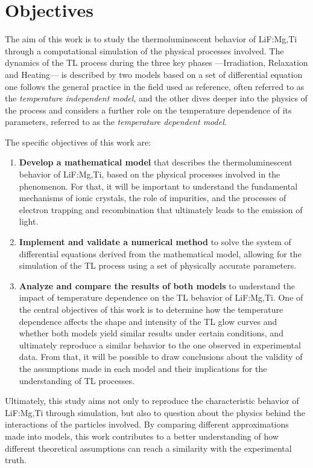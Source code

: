 \chapter{Objectives}\label{ch:2}

The aim of this work is to study the thermoluminescent behavior of LiF:Mg,Ti through a computational simulation of the physical processes involved. The dynamics of the TL process during the three key phases ---Irradiation, Relaxation and Heating--- is described by two models based on a set of differential equation one follows the general practice in the field used as reference, often referred to as the \textit{temperature independent model}, and the other dives deeper into the physics of the process and considers a further role on the temperature dependence of its parameters, referred to as the \textit{temperature dependent model}.

\vspace{10pt}

The specific objectives of this work are:
\begin{enumerate}[label=\textbf{\arabic*.}, font=\bfseries]
    \item \textbf{Develop a mathematical model} that describes the thermoluminescent behavior of LiF:Mg,Ti, based on the physical processes involved in the phenomenon. For that, it will be important to understand the fundamental mechanisms of ionic crystals, the role of impurities, and the processes of electron trapping and recombination that ultimately leads to the emission of light.
    \item \textbf{Implement and validate a numerical method} to solve the system of differential equations derived from the mathematical model, allowing for the simulation of the TL process using a set of physically accurate parameters.
    \item \textbf{Analyze and compare the results of both models} to understand the impact of temperature dependence on the TL behavior of LiF:Mg,Ti. One of the central objectives of this work is to determine how the temperature dependence affects the shape and intensity of the TL glow curves and whether both models yield similar results under certain conditions, and ultimately reproduce a similar behavior to the one observed in experimental data. From that, it will be possible to draw conclusions about the validity of the assumptions made in each model and their implications for the understanding of TL processes.
\end{enumerate}

\vspace{10pt}

Ultimately, this study aims not only to reproduce the characteristic behavior of LiF:Mg,Ti through simulation, but also to question about the physics behind the interactions of the particles involved. By comparing different approximations made into models, this work contributes to a better understanding of how different theoretical assumptions can reach a similarity with the experimental truth.